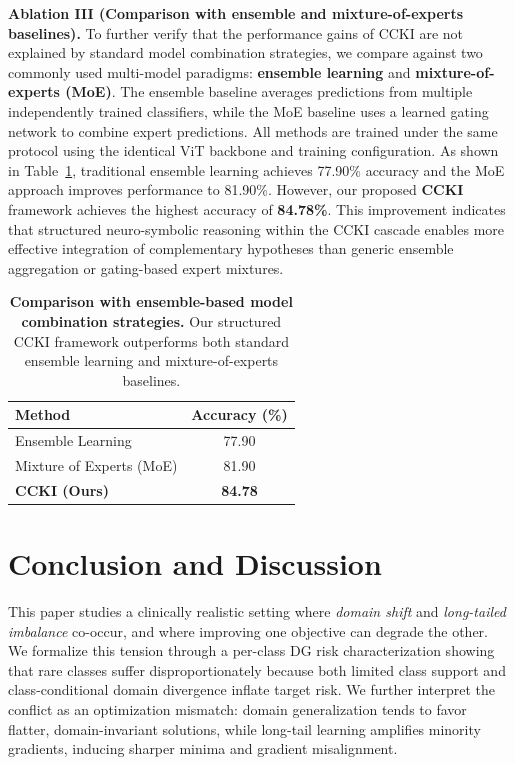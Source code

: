 \documentclass[runningheads]{llncs}
\begin{document}
\noindent\textbf{Ablation III (Comparison with ensemble and mixture-of-experts baselines).}
\label{app:kittler_moe}
To further verify that the performance gains of CCKI are not explained by standard model combination strategies, we compare against two commonly used multi-model paradigms: \textbf{ensemble learning} and \textbf{mixture-of-experts (MoE)}. The ensemble baseline averages predictions from multiple independently trained classifiers, while the MoE baseline uses a learned gating network to combine expert predictions. All methods are trained under the same protocol using the identical ViT backbone and training configuration. As shown in Table~\ref{tab:ensemble_ablation}, traditional ensemble learning achieves 77.90\% accuracy and the MoE approach improves performance to 81.90\%. However, our proposed \textbf{CCKI} framework achieves the highest accuracy of \textbf{84.78\%}. This improvement indicates that structured neuro-symbolic reasoning within the CCKI cascade enables more effective integration of complementary hypotheses than generic ensemble aggregation or gating-based expert mixtures.

\begin{table}[!htbp]
\centering
\scriptsize
\setlength{\tabcolsep}{6pt}
\caption{\textbf{Comparison with ensemble-based model combination strategies.} Our structured CCKI framework outperforms both standard ensemble learning and mixture-of-experts baselines.}
\begin{tabular}{lc}
\toprule
\textbf{Method} & \textbf{Accuracy (\%)} \\
\midrule
Ensemble Learning & 77.90 \\
Mixture of Experts (MoE) & 81.90 \\
\textbf{CCKI (Ours)} & \textbf{84.78} \\
\bottomrule
\end{tabular}

\label{tab:ensemble_ablation}
\end{table}

\vspace{-10mm}
\section{Conclusion and Discussion}
\label{sec:conclusion}

This paper studies a clinically realistic setting where \emph{domain shift} and \emph{long-tailed imbalance} co-occur, and where improving one objective can degrade the other. We formalize this tension through a per-class DG risk characterization showing that rare classes suffer disproportionately because both limited class support and class-conditional domain divergence inflate target risk. We further interpret the conflict as an optimization mismatch: domain generalization tends to favor flatter, domain-invariant solutions, while long-tail learning amplifies minority gradients, inducing sharper minima and gradient misalignment.
\end{document}
